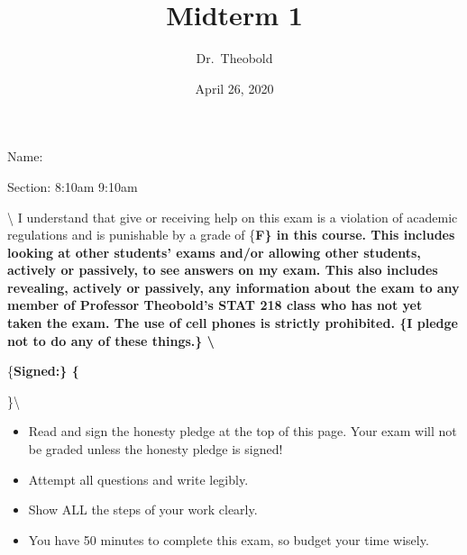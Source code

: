 \documentclass[
]{article}
\title{Midterm 1}
\author{Dr.~Theobold}
\date{April 26, 2020}
\begin{document}
\maketitle

\begin{center}
\large{Name:} \underline{\hspace{3in}}
\vspace{0.25cm}

\large{Section:} \hspace{0.25cm} 8:10am \hspace{2cm} 9:10am 

\end{center}

\vspace{0.8cm}

 \textbackslash{}
I understand that give or receiving help on this exam is a violation of
academic regulations and is punishable by a grade of \{\bf F\} in this
course. This includes looking at other students' exams and/or allowing
other students, actively or passively, to see answers on my exam. This
also includes revealing, actively or passively, any information about
the exam to any member of Professor Theobold's STAT 218 class who has
not yet taken the exam. The use of cell phones is strictly prohibited.
\{\bf I pledge not to do any of these things.\} \textbackslash{}

\vspace{0.25cm}

\{\bf Signed:\} \underline{\hspace{4in}}\{

\rule{0cm}{0.8cm}

\}\textbackslash{}


\begin{itemize}
\item Read and sign the honesty pledge at the top of this page. Your exam will
not be graded unless the honesty pledge is signed!
\item Attempt all questions and write legibly.
\item Show ALL the steps of your work clearly.
\item You have 50 minutes to complete this exam, so budget your time wisely.    
\end{itemize}

\pagebreak
\end{document}
